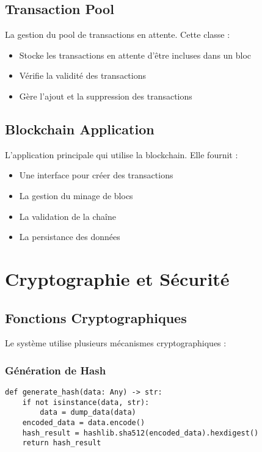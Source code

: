 \documentclass[french]{article}
\begin{document}
\subsection{Transaction Pool}
La gestion du pool de transactions en attente. Cette classe :
\begin{itemize}
    \item Stocke les transactions en attente d'être incluses dans un bloc
    \item Vérifie la validité des transactions
    \item Gère l'ajout et la suppression des transactions
\end{itemize}

\subsection{Blockchain Application}
L'application principale qui utilise la blockchain. Elle fournit :
\begin{itemize}
    \item Une interface pour créer des transactions
    \item La gestion du minage de blocs
    \item La validation de la chaîne
    \item La persistance des données
\end{itemize}

\section{Cryptographie et Sécurité}

\subsection{Fonctions Cryptographiques}
Le système utilise plusieurs mécanismes cryptographiques :

\subsubsection{Génération de Hash}
\begin{lstlisting}[style=python, caption=Génération de Hash]
def generate_hash(data: Any) -> str:
    if not isinstance(data, str):
        data = dump_data(data)
    encoded_data = data.encode()
    hash_result = hashlib.sha512(encoded_data).hexdigest()
    return hash_result
\end{lstlisting}
\end{document}
